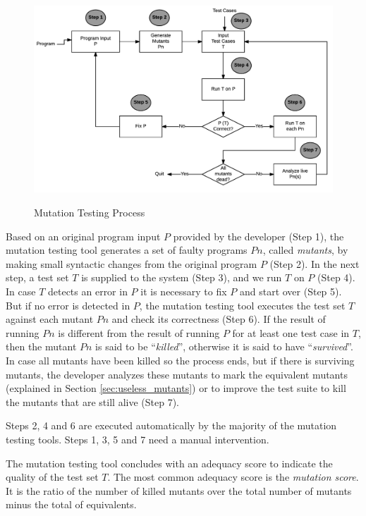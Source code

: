 \begin{figure}[h]
	\centering
	\caption{Mutation Testing Process}
	\includegraphics[scale=0.8]{images/mutation-testing-process.png}
	\label{fig:mutation_process}
\end{figure}

Based on an original program input $P$ provided by the developer (Step 1), the mutation testing tool generates a set of faulty programs $Pn$, called \textit{mutants}, by making small syntactic changes from the original program $P$ (Step 2). 
In the next step, a test set $T$ is supplied to the system (Step 3), and we run $T$ on $P$ (Step 4). 
In case $T$ detects an error in $P$ it is necessary to fix $P$ and start over (Step 5).
But if no error is detected in $P$, the mutation testing tool executes the test set $T$ against each mutant $Pn$ and check its correctness (Step 6). 
If the result of running $Pn$ is different from the result of running $P$ for at least one test case in $T$, then the mutant $Pn$ is said to be ``\textit{killed}'', otherwise it is said to have ``\textit{survived}''.
In case all mutants have been killed so the process ends, but if there is surviving mutants, the developer analyzes these mutants to mark the equivalent mutants (explained in Section \ref{sec:useless_mutants}) or to improve the test suite to kill the mutants that are still alive (Step 7).

Steps 2, 4 and 6 are executed automatically by the majority of the mutation testing tools. 
Steps 1, 3, 5 and 7 need a manual intervention.

The mutation testing tool concludes with an adequacy score to indicate the quality of the test set $T$. The most common adequacy score is the \textit{mutation score}. It is the ratio of the number of killed mutants over the total number of mutants minus the total of equivalents. 

